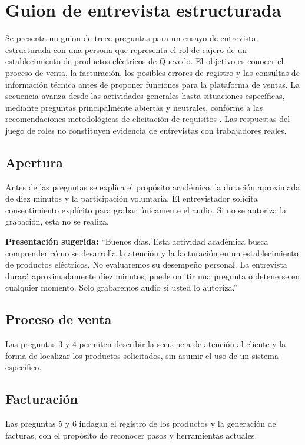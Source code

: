 \section{Guion de entrevista estructurada}
\label{sec:guion-entrevista}

Se presenta un guion de trece preguntas para un ensayo de entrevista estructurada con una persona que representa el rol de cajero de un establecimiento de productos eléctricos de Quevedo. El objetivo es conocer el proceso de venta, la facturación, los posibles errores de registro y las consultas de información técnica antes de proponer funciones para la plataforma de ventas. La secuencia avanza desde las actividades generales hasta situaciones específicas, mediante preguntas principalmente abiertas y neutrales, conforme a las recomendaciones metodológicas de elicitación de requisitos \cite{pohl2025,ireb2026}. Las respuestas del juego de roles no constituyen evidencia de entrevistas con trabajadores reales.

\subsection{Apertura}
Antes de las preguntas se explica el propósito académico, la duración aproximada de diez minutos y la participación voluntaria. El entrevistador solicita consentimiento explícito para grabar únicamente el audio. Si no se autoriza la grabación, esta no se realiza.

\noindent\textbf{Presentación sugerida:} ``Buenos días. Esta actividad académica busca comprender cómo se desarrolla la atención y la facturación en un establecimiento de productos eléctricos. No evaluaremos su desempeño personal. La entrevista durará aproximadamente diez minutos; puede omitir una pregunta o detenerse en cualquier momento. Solo grabaremos audio si usted lo autoriza.''

\subsection{Proceso de venta}
Las preguntas 3 y 4 permiten describir la secuencia de atención al cliente y la forma de localizar los productos solicitados, sin asumir el uso de un sistema específico.

\subsection{Facturación}
Las preguntas 5 y 6 indagan el registro de los productos y la generación de facturas, con el propósito de reconocer pasos y herramientas actuales.

